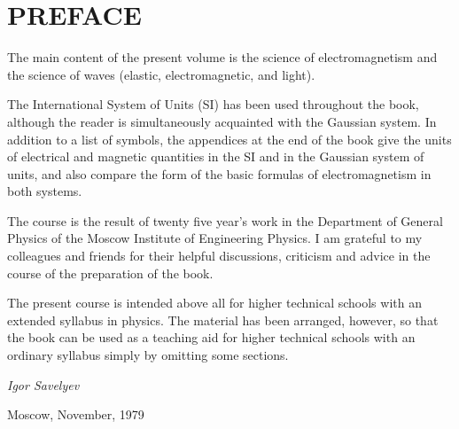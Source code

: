 

\chapter*{PREFACE}

The main content of the present volume is the science of electromagnetism and the science of waves (elastic, electromagnetic, and light).

The International System of Units (SI) has been used throughout the book, although the reader is simultaneously acquainted with the Gaussian system. In addition to a list of symbols, the appendices at the end of the book give the units of electrical and magnetic quantities in the SI and in the Gaussian system of units, and also compare the form of the basic formulas of electromagnetism in both systems.

The course is the result of twenty five year's work in the Department of General Physics of the Moscow Institute of Engineering Physics. I am grateful to my colleagues and friends for their helpful discussions, criticism and advice in the course of the preparation of the book.

The present course is intended above all for higher technical schools with an extended syllabus in physics. The material has been arranged, however, so that the book can be used as a teaching aid for higher technical schools with an ordinary syllabus simply by omitting some sections.

\begin{flushright}
	\emph{Igor Savelyev}
\end{flushright}

\noindent
Moscow, November, 1979

